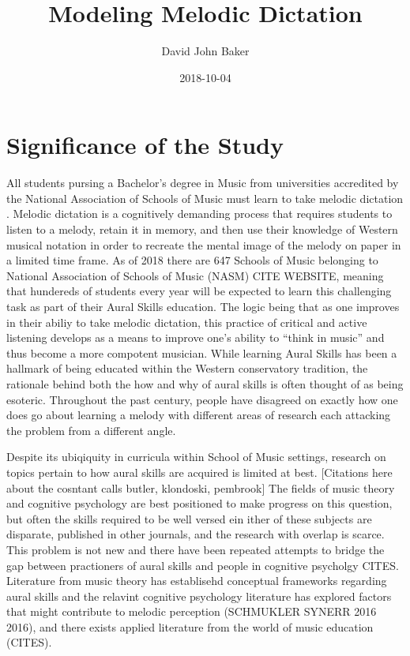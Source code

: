 \documentclass[]{book}
\title{Modeling Melodic Dictation}
\author{David John Baker}
\date{2018-10-04}
\theoremstyle{definition}
\theoremstyle{definition}
\theoremstyle{definition}
\theoremstyle{remark}
\begin{document}
\maketitle

{
\setcounter{tocdepth}{1}
\tableofcontents
}
\hypertarget{significance-of-the-study}{%
\chapter{Significance of the Study}\label{significance-of-the-study}}

All students pursing a Bachelor's degree in Music from universities
accredited by the National Association of Schools of Music must learn to
take melodic dictation \citep[ Section
VIII.6.B.2.A]{NationalAssociationSchools2018}. Melodic dictation is a
cognitively demanding process that requires students to listen to a
melody, retain it in memory, and then use their knowledge of Western
musical notation in order to recreate the mental image of the melody on
paper in a limited time frame. As of 2018 there are 647 Schools of Music
belonging to National Association of Schools of Music (NASM) CITE
WEBSITE, meaning that hundereds of students every year will be expected
to learn this challenging task as part of their Aural Skills education.
The logic being that as one improves in their abiliy to take melodic
dictation, this practice of critical and active listening develops as a
means to improve one's ability to ``think in music'' and thus become a
more compotent musician. While learning Aural Skills has been a hallmark
of being educated within the Western conservatory tradition, the
rationale behind both the how and why of aural skills is often thought
of as being esoteric. Throughout the past century, people have disagreed
on exactly how one does go about learning a melody with different areas
of research each attacking the problem from a different angle.

Despite its ubiqiquity in curricula within School of Music settings,
research on topics pertain to how aural skills are acquired is limited
at best. {[}Citations here about the cosntant calls butler, klondoski,
pembrook{]} The fields of music theory and cognitive psychology are best
positioned to make progress on this question, but often the skills
required to be well versed ein ither of these subjects are disparate,
published in other journals, and the research with overlap is scarce.
This problem is not new and there have been repeated attempts to bridge
the gap between practioners of aural skills and people in cognitive
psycholgy CITES. Literature from music theory has establisehd conceptual
frameworks regarding aural skills
\citet{karpinskiAuralSkillsAcquisition2000} and the relavint cognitive
psychology literature has explored factors that might contribute to
melodic perception (SCHMUKLER SYNERR 2016 2016), and there exists
applied literature from the world of music education (CITES).
\end{document}
